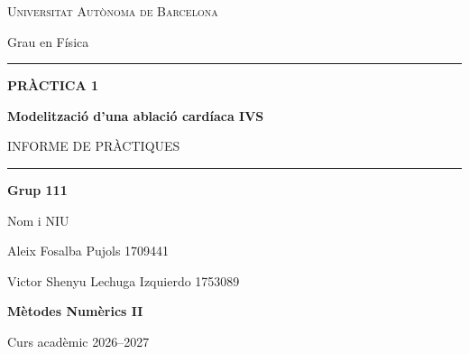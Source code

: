 \documentclass[a4paper,12pt,oneside]{article}
\begin{document}
\begin{titlepage}
    \thispagestyle{empty}
    \centering

    \vspace*{1.5cm}

    {\Large\scshape Universitat Autònoma de Barcelona\par}
    \vspace{0.3cm}
    {\large Grau en Física\par}

    \vspace{2.5cm}

    {\color{gray}\rule{1\textwidth}{1.2pt}\par}

    \vspace{0.8cm}

    {\large\bfseries PRÀCTICA 1\par}

    \vspace{0.5cm}

    {\Huge\bfseries Modelització d'una ablació cardíaca IVS\par}

    \vspace{0.6cm}

    {\large INFORME DE PRÀCTIQUES\par}

    \vspace{0.8cm}

    {\color{gray}\rule{1\textwidth}{1.2pt}\par}

    \vspace{2cm}

    {\large\bfseries Grup 111\par}

    \vspace{0.8cm}

    {\large Nom i NIU\par}
    \vspace{0.2cm}
    {\large Aleix Fosalba Pujols 1709441\par}
    \vspace{0.2cm}
    {\large Victor Shenyu Lechuga Izquierdo 1753089\par}
    \vspace{0.2cm}
    

    \vfill

    {\large\bfseries Mètodes Numèrics II\par}

    \vspace{0.3cm}

    {\large Curs acadèmic 2026--2027\par}

    \vspace{1cm}

\end{titlepage}
\end{document}
